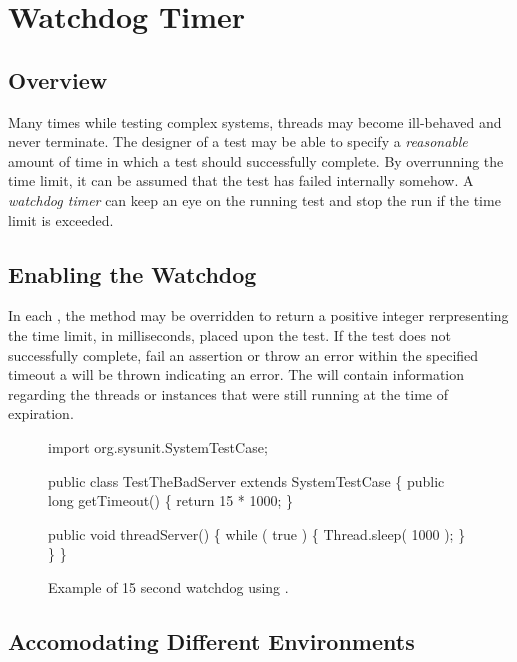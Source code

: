 \chapter{Watchdog Timer}

\section{Overview}

Many times while testing complex systems, threads may become
ill-behaved and never terminate.  The designer of a test may
be able to specify a \emph{reasonable} amount of time
in which a test should successfully complete.  By overrunning
the time limit, it can be assumed that the test has failed
internally somehow.  A \emph{watchdog timer} 
can keep an eye on the running test and stop the run if
the time limit is exceeded.

\section{Enabling the Watchdog}

In each ,  the method
may be overridden to return a positive integer rerpresenting
the time limit, in milliseconds, placed upon the test.  If
the test does not successfully complete, fail an assertion
or throw an error within the specified timeout a
 will be thrown indicating
an error.  The  will contain
information regarding the threads or  instances
that were still running at the time of expiration.

\begin{figure}
\begin{codelisting}
import org.sysunit.SystemTestCase;

public class TestTheBadServer
    extends SystemTestCase
\{
    public long getTimeout() 
    \{
        return 15 * 1000;
    \}

    public void threadServer() 
    \{
        while ( true ) 
        \{
            Thread.sleep( 1000 );
        \}
    \}
\}
\end{codelisting}
\caption{Example of 15 second watchdog using
.}
\end{figure}

\section{Accomodating Different Environments}

